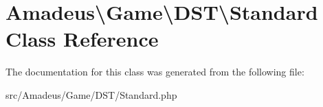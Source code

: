 \hypertarget{classAmadeus_1_1Game_1_1DST_1_1Standard}{}\section{Amadeus\textbackslash{}Game\textbackslash{}D\+ST\textbackslash{}Standard Class Reference}
\label{classAmadeus_1_1Game_1_1DST_1_1Standard}


The documentation for this class was generated from the following file\+:\begin{DoxyCompactItemize}
\item 
src/\+Amadeus/\+Game/\+D\+S\+T/Standard.\+php\end{DoxyCompactItemize}

